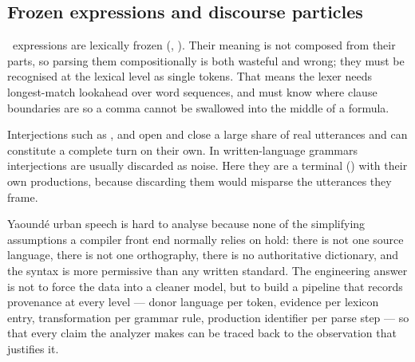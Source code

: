\subsection{Frozen expressions and discourse particles}

\LexiconMultiword\ expressions are lexically frozen (, ). Their meaning is not composed from their parts, so parsing them compositionally
is both wasteful and wrong; they must be recognised at the lexical level as single
 tokens. That means the lexer needs longest-match lookahead over word
sequences, and must know where clause boundaries are so a comma cannot be swallowed into
the middle of a formula.

Interjections such as ,  and  open and close a large share of real
utterances and can constitute a complete turn on their own. In written-language grammars
interjections are usually discarded as noise. Here they are a terminal () with
their own productions, because discarding them would misparse the utterances they frame.

\begin{keypoint}
Yaound\'e urban speech is hard to analyse because none of the simplifying assumptions a
compiler front end normally relies on hold: there is not one source language, there is not
one orthography, there is no authoritative dictionary, and the syntax is more permissive
than any written standard. The engineering answer is not to force the data into a cleaner
model, but to build a pipeline that records provenance at every level --- donor language per
token, evidence per lexicon entry, transformation per grammar rule, production identifier
per parse step --- so that every claim the analyzer makes can be traced back to the
observation that justifies it.
\end{keypoint}
